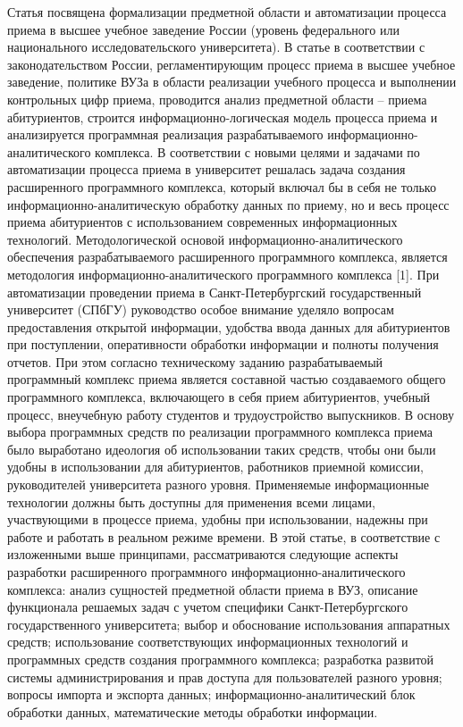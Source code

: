 \documentclass[12pt]{article}
\begin{document}
 Статья посвящена формализации предметной области и автоматизации процесса приема в  высшее учебное заведение России (уровень федерального или национального исследовательского университета). В статье в соответствии с законодательством России, регламентирующим процесс приема в высшее учебное заведение, политике ВУЗа в области реализации учебного процесса и выполнении контрольных цифр приема, проводится анализ предметной области – приема абитуриентов, строится информационно-логическая модель процесса приема и анализируется программная реализация разрабатываемого информационно-аналитического комплекса.
    В соответствии с новыми целями и задачами по автоматизации процесса приема в университет решалась задача создания расширенного программного комплекса, который включал бы в себя не только информационно-аналитическую обработку данных по приему, но и весь процесс приема абитуриентов с использованием современных информационных технологий.
    Методологической основой информационно-аналитического обеспечения разрабатываемого  расширенного программного комплекса, является методология информационно-аналитического программного комплекса [1]. 
    При автоматизации проведении приема в Санкт-Петербургский государственный университет (СПбГУ) руководство особое внимание уделяло вопросам предоставления открытой информации, удобства ввода данных для абитуриентов при поступлении, оперативности обработки информации и полноты получения отчетов. При этом согласно техническому заданию  разрабатываемый программный комплекс приема является составной частью создаваемого общего программного комплекса, включающего в себя прием абитуриентов, учебный процесс, внеучебную работу студентов и трудоустройство выпускников. 
    В основу выбора программных средств по реализации программного комплекса приема было выработано идеология об использовании таких средств, чтобы они были удобны в использовании для абитуриентов, работников приемной комиссии, руководителей университета разного уровня. Применяемые информационные технологии должны быть доступны для применения всеми лицами, участвующими в процессе приема, удобны при использовании, надежны при работе и работать в реальном режиме времени. 
    В этой статье, в соответствие с изложенными выше принципами, рассматриваются следующие аспекты разработки расширенного программного информационно-аналитического комплекса:
    анализ сущностей предметной области приема в ВУЗ, описание  функционала решаемых задач с учетом специфики Санкт-Петербургского государственного университета;
    выбор и обоснование использования аппаратных средств;
    использование соответствующих информационных технологий и программных средств создания программного комплекса; 
    разработка развитой системы администрирования и прав доступа для пользователей разного уровня;
    вопросы импорта и экспорта данных;
    информационно-аналитический блок обработки данных, математические методы обработки информации.
\end{document}
